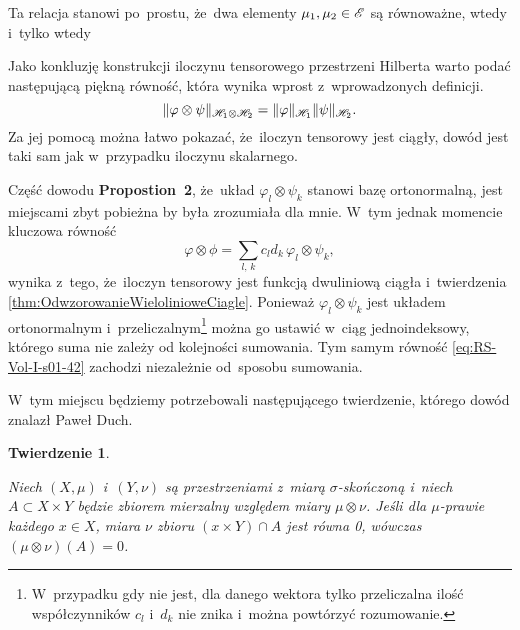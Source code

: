\documentclass[a4paper,11pt]{article}
\numberwithin{equation}{section}
\newtheorem{theorem}{Twierdzenie}
\begin{document}
Ta relacja stanowi po~prostu, że~dwa elementy
$\mu_{ 1 }, \mu_{ 2 } \in \mathcal{E}$ są równoważne, wtedy i~tylko wtedy

\VerSpaceFour



 Jako konkluzję konstrukcji iloczynu tensorowego
przestrzeni Hilberta warto podać następującą piękną równość, która
wynika wprost z~wprowadzonych definicji.
\begin{equation}
  \label{eq:RS-Vol-I-s01-41}
  \lVert{  \varphi \otimes \psi  }\rVert_{ \mathcal{H}_{ 1 } \otimes \mathcal{H}_{ 2 } }
  = \lVert{  \varphi  }\rVert_{ \mathcal{H}_{ 1 } } \lVert{  \psi  }\rVert_{ \mathcal{H}_{ 2 } }.
\end{equation}
Za jej pomocą można łatwo pokazać, że~iloczyn tensorowy jest ciągły,
dowód jest taki sam jak w~przypadku iloczynu skalarnego. %

\VerSpaceFour



\noindent
{} Część dowodu \textbf{Propostion~2}, że~układ
$\varphi_{ l } \otimes \psi_{ k }$ stanowi bazę ortonormalną, jest miejscami
zbyt pobieżna by była zrozumiała dla mnie. W~tym jednak momencie
kluczowa równość
\begin{equation}
  \label{eq:RS-Vol-I-s01-42}
  \varphi \otimes \phi = \sum_{ l,\, k } c_{ l } d_{ k }\, \varphi_{ l } \otimes \psi_{ k },
\end{equation}
wynika z~tego, że~iloczyn tensorowy jest funkcją dwuliniową ciągła
i~twierdzenia \eqref{thm:OdwzorowanieWielolinioweCiagle}. Ponieważ
$\varphi_{ l } \otimes \psi_{ k }$ jest układem ortonormalnym
i~przeliczalnym\footnote{W~przypadku gdy nie jest, dla danego wektora
  tylko przeliczalna ilość współczynników $c_{ l }$ i~$d_{ k }$ nie
  znika i~można powtórzyć rozumowanie.} można go ustawić w~ciąg
jednoindeksowy, którego suma nie zależy od kolejności sumowania. Tym
samym równość \eqref{eq:RS-Vol-I-s01-42} zachodzi niezależnie od~sposobu
sumowania.

\VerSpaceFour



 W~tym miejscu będziemy potrzebowali następującego
twierdzenie, którego dowód znalazł Paweł Duch.





\begin{theorem}
  \label{thm:TwierdzenieOIloczynieMiarPWZerowym}

  Niech $( X, \mu )$ i~$( Y, \nu )$ są przestrzeniami z~miarą
  $\sigma$-skończoną i~niech $A \subset X \times Y$ będzie zbiorem
  mierzalny względem miary $\mu \otimes \nu$. Jeśli dla $\mu$-prawie
  każdego $x \in X$, miara $\nu$ zbioru $( x \times Y ) \cap A$ jest
  równa 0, wówczas $(\mu \otimes \nu)( A ) = 0$.

\end{theorem}
\end{document}
